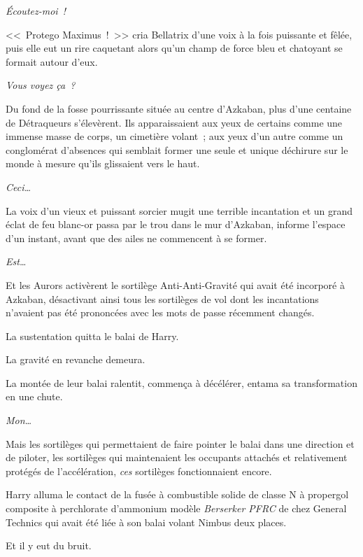 \emph{Écoutez-moi~!}

<<~Protego Maximus~!~>> cria Bellatrix d'une voix à la fois puissante et fêlée, puis elle eut un rire caquetant alors qu'un champ de force bleu et chatoyant se formait autour d'eux.

\emph{Vous voyez ça~?}

Du fond de la fosse pourrissante située au centre d'Azkaban, plus d'une centaine de Détraqueurs s'élevèrent. Ils apparaissaient aux yeux de certains comme une immense masse de corps, un cimetière volant~; aux yeux d'un autre comme un conglomérat d'absences qui semblait former une seule et unique déchirure sur le monde à mesure qu'ils glissaient vers le haut.

\emph{Ceci…}

La voix d'un vieux et puissant sorcier mugit une terrible incantation et un grand éclat de feu blanc-or passa par le trou dans le mur d'Azkaban, informe l'espace d'un instant, avant que des ailes ne commencent à se former.

\emph{Est…}

Et les Aurors activèrent le sortilège Anti-Anti-Gravité qui avait été incorporé à Azkaban, désactivant ainsi tous les sortilèges de vol dont les incantations n'avaient pas été prononcées avec les mots de passe récemment changés.

La sustentation quitta le balai de Harry.

La gravité en revanche demeura.

La montée de leur balai ralentit, commença à décélérer, entama sa transformation en une chute.

\emph{Mon…}

Mais les sortilèges qui permettaient de faire pointer le balai dans une direction et de piloter, les sortilèges qui maintenaient les occupants attachés et relativement protégés de l'accélération, \emph{ces} sortilèges fonctionnaient encore.


Harry alluma le contact de la fusée à combustible solide de classe N à propergol composite à perchlorate d'ammonium modèle \emph{Berserker PFRC} de chez General Technics qui avait été liée à son balai volant Nimbus  deux places.

Et il y eut du bruit. 

